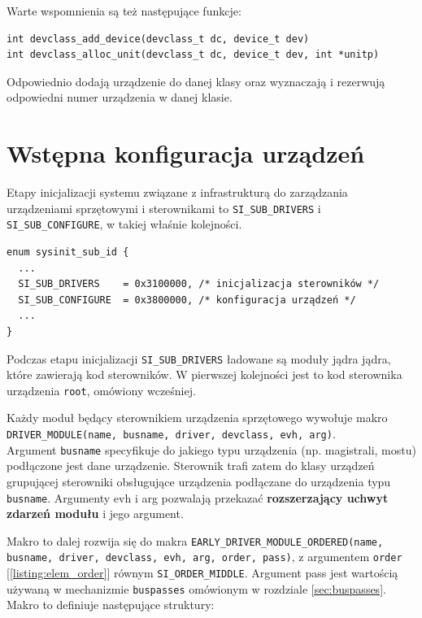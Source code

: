 \documentclass[shortabstract,inz]{iithesis}
\begin{document}
Warte wspomnienia są też następujące funkcje:

\begin{lstlisting}
int devclass_add_device(devclass_t dc, device_t dev)
int devclass_alloc_unit(devclass_t dc, device_t dev, int *unitp)
\end{lstlisting}

Odpowiednio dodają urządzenie do danej klasy oraz wyznaczają i rezerwują 
odpowiedni numer urządzenia w danej klasie.





\section{Wstępna konfiguracja urządzeń} %

Etapy inicjalizacji systemu związane z infrastrukturą do zarządzania 
urządzeniami sprzętowymi i sterownikami to \texttt{SI\_SUB\_DRIVERS} i \texttt{SI\_SUB\_CONFIGURE}, 
w takiej właśnie kolejności.

\begin{lstlisting}[caption=Etapy inicjalizacji systemu]
enum sysinit_sub_id {
  ...
  SI_SUB_DRIVERS    = 0x3100000, /* inicjalizacja sterowników */
  SI_SUB_CONFIGURE  = 0x3800000, /* konfiguracja urządzeń */
  ...
}
\end{lstlisting}

Podczas etapu inicjalizacji \texttt{SI\_SUB\_DRIVERS} ładowane są moduły jądra jądra, które
zawierają kod sterowników. W pierwszej kolejności jest to kod sterownika urządzenia \texttt{root},
omówiony wcześniej.

Każdy moduł będący sterownikiem urządzenia sprzętowego wywołuje makro
\texttt{DRIVER\_MODULE(name, busname, driver, devclass, evh, arg)}. \\
Argument \texttt{busname} specyfikuje do jakiego typu urządzenia (np. magistrali, mostu) podłączone jest 
dane urządzenie. Sterownik trafi zatem do klasy urządzeń grupującej sterowniki obsługujące
urządzenia podłączane do urządzenia typu \texttt{busname}.
Argumenty evh i arg pozwalają przekazać \textbf{rozszerzający uchwyt zdarzeń modułu} i jego argument.


Makro to dalej rozwija się do makra
\texttt{EARLY\_DRIVER\_MODULE\_ORDERED(name, busname, driver, devclass, evh, arg, order, pass)},
z argumentem \texttt{order} [\ref{listing:elem_order}] równym \texttt{SI\_ORDER\_MIDDLE}.
Argument pass jest wartością
używaną w mechanizmie \texttt{buspasses}  omówionym w rozdziale \ref{sec:buspasses}.
Makro to definiuje następujące struktury: 
\end{document}
